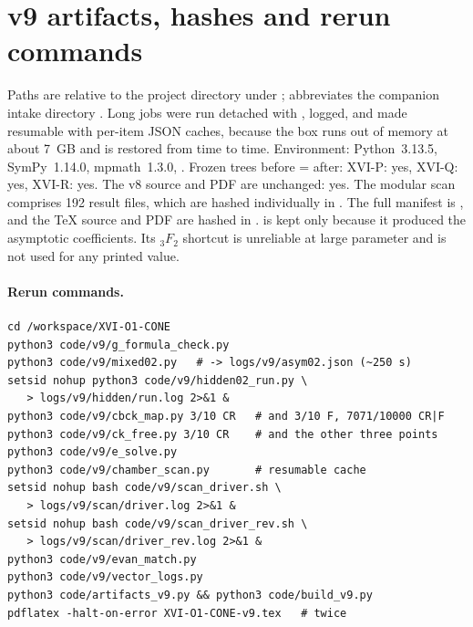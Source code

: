 
\section{v9 artifacts, hashes and rerun commands}
\label{app:v9artifacts}

Paths are relative to the project directory  under ;  abbreviates the companion intake directory . Long jobs
were run detached with , logged, and made resumable
with per-item JSON caches, because the box runs out of memory at
about 7~GB and is restored from time to time. Environment:
Python~3.13.5, SymPy~1.14.0, mpmath~1.3.0, .
Frozen trees before = after: XVI-P: yes, XVI-Q: yes, XVI-R: yes.
The v8 source and PDF are unchanged: yes.
The modular scan comprises 192 result files, which are hashed individually in
. The full manifest is
, and the \TeX{} source and
PDF are hashed in .
 is kept only because it produced the
asymptotic coefficients. Its \({}_3F_2\) shortcut is unreliable at
large parameter and is not used for any printed value.

\paragraph{Rerun commands.}
\begin{verbatim}
cd /workspace/XVI-O1-CONE
python3 code/v9/g_formula_check.py
python3 code/v9/mixed02.py   # -> logs/v9/asym02.json (~250 s)
setsid nohup python3 code/v9/hidden02_run.py \
   > logs/v9/hidden/run.log 2>&1 &
python3 code/v9/cbck_map.py 3/10 CR   # and 3/10 F, 7071/10000 CR|F
python3 code/v9/ck_free.py 3/10 CR    # and the other three points
python3 code/v9/e_solve.py
python3 code/v9/chamber_scan.py       # resumable cache
setsid nohup bash code/v9/scan_driver.sh \
   > logs/v9/scan/driver.log 2>&1 &
setsid nohup bash code/v9/scan_driver_rev.sh \
   > logs/v9/scan/driver_rev.log 2>&1 &
python3 code/v9/evan_match.py
python3 code/v9/vector_logs.py
python3 code/artifacts_v9.py && python3 code/build_v9.py
pdflatex -halt-on-error XVI-O1-CONE-v9.tex   # twice
\end{verbatim}

